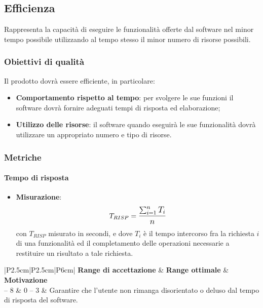 \subsection{Efficienza}
\label{efficienza}
Rappresenta la capacità di eseguire le funzionalità offerte dal software nel minor tempo possibile utilizzando al tempo stesso il minor numero di risorse possibili.

\subsubsection{Obiettivi di qualità}
Il prodotto dovrà essere efficiente, in particolare:
\begin{itemize}
\item \textbf{Comportamento rispetto al tempo}:  per svolgere le sue funzioni il software dovrà fornire adeguati tempi di risposta ed elaborazione;
\item \textbf{Utilizzo delle risorse}: il software quando eseguirà le sue funzionalità dovrà utilizzare un appropriato numero e tipo di risorse.
\end{itemize}

\subsubsection{Metriche}
\paragraph{Tempo di risposta}

\begin{itemize}
	\item \textbf{Misurazione}: 
		$$T_{RISP} = \mathlarger{\frac{\sum_{i=1}^{n} T_{i}}{n}}$$ 
	con $T_{RISP}$ misurato in secondi, e dove $T_{i}$ è il tempo intercorso fra la richiesta $i$ di una funzionalità ed il completamento delle operazioni necessarie a restituire un risultato a tale richiesta.

\end{itemize}

\begin{center}
		\begin{tabular}{|P{2.5cm}|P{2.5cm}|P{6cm}|}
		\hline
			\textbf{Range di accettazione}	& \textbf{Range ottimale} & \textbf{Motivazione} \\
			 -- 8 & 0 -- 3 &	Garantire che l'utente non rimanga disorientato o deluso dal tempo di risposta del software. \\
			\hline
			\end{tabular}
\end{center}

